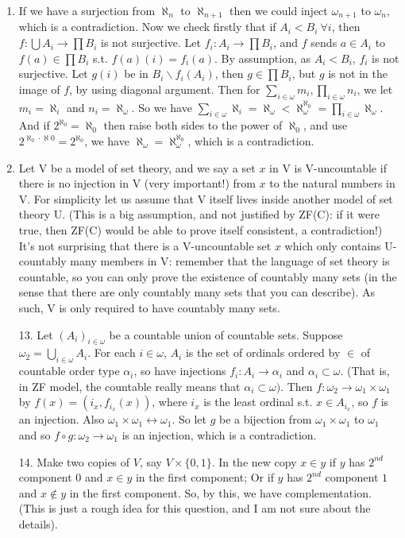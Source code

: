 \begin{enumerate}
\item If we have a surjection from $\aleph_n$ to $\aleph_{n+1}$ then we could inject $\omega_{n+1}$ to $\omega_n$, which is a contradiction. Now we check firstly that if $A_i<B_i~\forall i$, then $f: \bigcup A_i \rightarrow \prod B_i$ is not surjective. Let $f_i: A_i \rightarrow \prod B_i$, and $f$ sends $a \in A_i$ to $f(a) \in \prod B_i$ s.t. $f(a)(i)=f_i(a)$. By assumption, as $A_i <B_i$, $f_i$ is not surjective. Let $g(i)$ be in $B_i \backslash f_i(A_i)$, then $g \in \prod B_i$, but $g$ is not in the image of $f$, by using diagonal argument. Then for $\sum_{i \in \omega}m_i, \prod_{i \in \omega}n_i$, we let $m_i=\aleph_i$ and $n_i=\aleph_\omega$. So we have $\sum_{i \in \omega}\aleph_i = \aleph_\omega < \aleph_\omega^{\aleph_0}=\prod_{i \in \omega}\aleph_\omega$. And if $2^{\aleph_0}=\aleph_0$ then raise both sides to the power of $\aleph_0$, and use $2^{\aleph_0 \cdot \aleph 0}=2^{\aleph_0}$, we have $\aleph_\omega=\aleph_\omega^{\aleph_0}$, which is a contradiction.\\
\item Let V be a model of set theory, and we say a set $x$ in V is V-uncountable if there is no
injection in V (very important!) from $x$ to the natural numbers in V. For
simplicity let us assume that V itself lives inside another model of set
theory U. (This is a big assumption, and not justified by ZF(C): if it were
true, then ZF(C) would be able to prove itself consistent, a contradiction!)
It's not surprising that there is a V-uncountable set $x$ which only
contains U-countably many members in V: remember that the language of set
theory is countable, so you can only prove the existence of countably many
sets (in the sense that there are only countably many sets that you can
describe). As such, V is only required to have countably many sets.\\

\item[13.] Let $(A_i)_{i \in \omega}$ be a countable union of countable sets. Suppose $\omega_2 = \bigcup_{i \in \omega}A_i$. For each $i \in \omega$, $A_i$ is the set of ordinals ordered by $\in$ of countable order type $\alpha_i$, so have injections $f_i: A_i \rightarrow \alpha_i$ and $\alpha_i \subset \omega$. (That is, in ZF model, the countable really means that $\alpha_i \subset \omega)$. Then $f: \omega_2 \rightarrow \omega_1 \times \omega_1$ by $f(x) = (i_x,f_{i_x}(x))$, where $i_x$ is the least ordinal s.t. $x \in A_{i_x}$, so $f$ is an injection. Also $\omega_1 \times \omega_1 \leftrightarrow \omega_1$. So let $g$ be a bijection from $\omega_1 \times \omega_1$ to $\omega_1$ and so $f \circ g: \omega_2 \rightarrow \omega_1$ is an injection, which is a contradiction.\\
\item[14.] Make two copies of $V$, say $V \times \{0,1\}$. In the new copy $x \in y$ if $y$ has $2^{nd}$ component $0$ and $x \in y$ in the first component; Or if $y$ has $2^{nd}$ component $1$ and $x \not \in y$ in the first component. So, by this, we have complementation. (This is just a rough idea for this question, and I am not sure about the details).
\end{enumerate}
